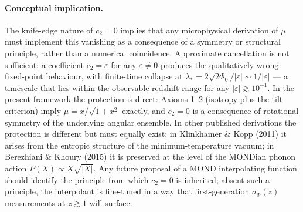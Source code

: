 \paragraph{Conceptual implication.} The knife-edge nature of $c_2 = 0$
implies that any microphysical derivation of $\mu$ must implement this
vanishing as a consequence of a symmetry or structural principle, rather
than a numerical coincidence. Approximate cancellation is not sufficient:
a coefficient $c_2 = \varepsilon$ for any $\varepsilon \neq 0$ produces
the qualitatively wrong fixed-point behaviour, with finite-time collapse
at $\lambda_* = 2\sqrt{2\Phi_0}/|\varepsilon| \sim 1/|\varepsilon|$ — a
timescale that lies within the observable redshift range for any
$|\varepsilon| \gtrsim 10^{-1}$. In the present framework the protection
is direct: Axioms 1--2 (isotropy plus the tilt criterion) imply
$\mu = x/\sqrt{1+x^2}$ exactly, and $c_2 = 0$ is a consequence of
rotational symmetry of the underlying angular ensemble. In other
published derivations the protection is different but must equally exist:
in Klinkhamer \& Kopp (2011) it arises from the entropic structure of the
minimum-temperature vacuum; in Berezhiani \& Khoury (2015) it is
preserved at the level of the MONDian phonon action $P(X) \propto
X\sqrt{|X|}$. Any future proposal of a MOND interpolating function should
identify the principle from which $c_2 = 0$ is inherited; absent such a
principle, the interpolant is fine-tuned in a way that first-generation
$\sigma_\Phi(z)$ measurements at $z \gtrsim 1$ will surface.
